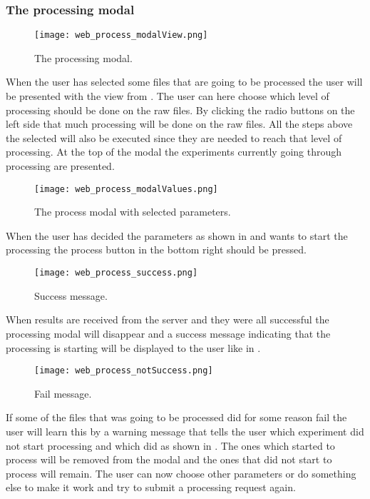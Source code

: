 \subsubsection{The processing modal}
\begin{figure}[h]
\centering
\texttt{[image: web\_process\_modalView.png]}
\caption{\label{fig:web_process_modalView}The processing modal.}
\end{figure}
\FloatBarrier
When the user has selected some files that are going to be processed the user will be presented with the view from . The user can here choose which level of processing should be done on the raw files.
By clicking the radio buttons on the left side that much processing will be done on the raw files. All the steps above the selected will also be executed since they are needed to reach that level of processing.
At the top of the modal the experiments currently going through processing are presented.
\begin{figure}[h]
\centering
\texttt{[image: web\_process\_modalValues.png]}
\caption{\label{fig:web_process_modalValues}The process modal with selected parameters.}
\end{figure}
\FloatBarrier
When the user has decided the parameters as shown in  and wants to start the processing the process button in the bottom right should be pressed. 
\begin{figure}[h]
\centering
\texttt{[image: web\_process\_success.png]}
\caption{\label{fig:web_process_success}Success message.}
\end{figure}
\FloatBarrier
When results are received from the server and they were all successful the processing modal will disappear and a success message indicating that the processing is starting will be displayed to the user like in .
\begin{figure}[h]
\centering
\texttt{[image: web\_process\_notSuccess.png]}
\caption{\label{fig:web_process_notSuccess}Fail message.}
\end{figure}
If some of the files that was going to be processed did for some reason fail the user will learn this by a warning message that tells the user which experiment did not start processing and which did as shown in . The ones which started to process will be removed from the modal and the ones that did not start to process will remain. The user can now choose other parameters or do something else to make it work and try to submit a processing request again.
\pagebreak
